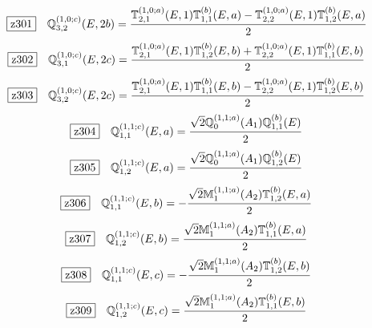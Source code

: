 \documentclass[fleqn,10pt,landscape]{jsarticle}
\begin{document}
\begin{dmath*}
\hspace*{3mm}\fbox{z301}\quad \mathbb{Q}_{3,2}^{(1,0;c)}(E,2b)=\frac{\mathbb{T}_{2,1}^{(1,0;a)}(E,1) \mathbb{T}_{1,1}^{(b)}(E,a) - \mathbb{T}_{2,2}^{(1,0;a)}(E,1) \mathbb{T}_{1,2}^{(b)}(E,a)}{2}
\end{dmath*}
\begin{dmath*}
\hspace*{3mm}\fbox{z302}\quad \mathbb{Q}_{3,1}^{(1,0;c)}(E,2c)=\frac{\mathbb{T}_{2,1}^{(1,0;a)}(E,1) \mathbb{T}_{1,2}^{(b)}(E,b) + \mathbb{T}_{2,2}^{(1,0;a)}(E,1) \mathbb{T}_{1,1}^{(b)}(E,b)}{2}
\end{dmath*}
\begin{dmath*}
\hspace*{3mm}\fbox{z303}\quad \mathbb{Q}_{3,2}^{(1,0;c)}(E,2c)=\frac{\mathbb{T}_{2,1}^{(1,0;a)}(E,1) \mathbb{T}_{1,1}^{(b)}(E,b) - \mathbb{T}_{2,2}^{(1,0;a)}(E,1) \mathbb{T}_{1,2}^{(b)}(E,b)}{2}
\end{dmath*}
\begin{dmath*}
\hspace*{3mm}\fbox{z304}\quad \mathbb{Q}_{1,1}^{(1,1;c)}(E,a)=\frac{\sqrt{2} \mathbb{Q}_{0}^{(1,1;a)}(A_{1}) \mathbb{Q}_{1,1}^{(b)}(E)}{2}
\end{dmath*}
\begin{dmath*}
\hspace*{3mm}\fbox{z305}\quad \mathbb{Q}_{1,2}^{(1,1;c)}(E,a)=\frac{\sqrt{2} \mathbb{Q}_{0}^{(1,1;a)}(A_{1}) \mathbb{Q}_{1,2}^{(b)}(E)}{2}
\end{dmath*}
\begin{dmath*}
\hspace*{3mm}\fbox{z306}\quad \mathbb{Q}_{1,1}^{(1,1;c)}(E,b)=- \frac{\sqrt{2} \mathbb{M}_{1}^{(1,1;a)}(A_{2}) \mathbb{T}_{1,2}^{(b)}(E,a)}{2}
\end{dmath*}
\begin{dmath*}
\hspace*{3mm}\fbox{z307}\quad \mathbb{Q}_{1,2}^{(1,1;c)}(E,b)=\frac{\sqrt{2} \mathbb{M}_{1}^{(1,1;a)}(A_{2}) \mathbb{T}_{1,1}^{(b)}(E,a)}{2}
\end{dmath*}
\begin{dmath*}
\hspace*{3mm}\fbox{z308}\quad \mathbb{Q}_{1,1}^{(1,1;c)}(E,c)=- \frac{\sqrt{2} \mathbb{M}_{1}^{(1,1;a)}(A_{2}) \mathbb{T}_{1,2}^{(b)}(E,b)}{2}
\end{dmath*}
\begin{dmath*}
\hspace*{3mm}\fbox{z309}\quad \mathbb{Q}_{1,2}^{(1,1;c)}(E,c)=\frac{\sqrt{2} \mathbb{M}_{1}^{(1,1;a)}(A_{2}) \mathbb{T}_{1,1}^{(b)}(E,b)}{2}
\end{dmath*}
\end{document}
